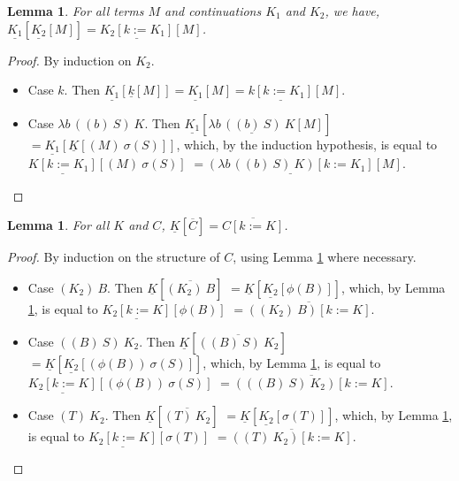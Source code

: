 \documentclass{LMCS}
\newtheorem{lemma}[theorem]{Lemma}
\begin{document}
\begin{lemma}
  \label{lem:continuation-composition-a} For all terms $M$ and continuations
  $K_{1}$ and $K_{2}$, we have,
  $\underline{K_{1}}[\underline{K_{2}}[M]]=\underline{K_{2}[k:=K_{1}]}[M]$.
\end{lemma}
\begin{proof}
  By induction on $K_{2}$.
  \begin{itemize}
    \item Case $k$. Then $\underline{K_{1}}[\underline{k}[M]]=\underline{K_{1}}[M]=\underline{k[k:=K_{1}]}[M]$.
    \item Case $\lambda b\,((b)~S)~K$. Then 
      $\underline{K_{1}}[\underline{\lambda b\,((b)~S)~K}[M]]$
      $=\underline{K_{1}}[\underline{K}[(M)~\sigma(S)]]$,
      which, by the induction hypothesis, is equal to
      $\underline{K[k:=K_{1}]}[(M)~\sigma(S)]$
      $=\underline{(\lambda b\,((b)~S)~K)[k:=K_{1}]}[M]$.
      \qedhere
  \end{itemize}
\end{proof}

\begin{lemma}
  {\label{lem:continuation-substitution-a} For all $K$ and
  $C$, $\underline{K}[\overline{C}]=\overline{C[k:=K]}$}.
\end{lemma}
\begin{proof}
  By induction on the structure of $C$, using Lemma \ref{lem:continuation-composition-a}
  where necessary.
  \begin{itemize}
    \item Case $(K_{2})~B$. Then 
      $\underline{K}[\overline{(K_{2})~B}]$
      $=\underline{K}[\underline{K_{2}}[\phi(B)]]$,
      which, by Lemma \ref{lem:continuation-composition-a}, is equal to
      $\underline{K_{2}[k:=K]}[\phi(B)]$
      $=\overline{((K_{2})~B)[k:=K]}$.

    \item Case $((B)~S)~K_{2}$. Then 
      $\underline{K}[\overline{((B)~S)~K_{2}}]$
      $=\underline{K}[\underline{K_{2}}[(\phi(B))~\sigma(S)]]$,
      which, by Lemma \ref{lem:continuation-composition-a}, is equal to
      $\underline{K_{2}[k:=K]}[(\phi(B))~\sigma(S)]$
      $=\overline{(((B)~S)~K_{2})[k:=K]}$.

    \item Case $(T)~K_{2}$. Then 
      $\underline{K}[\overline{(T)~K_{2}}]$
      $=\underline{K}[\underline{K_{2}}[\sigma(T)]]$,
      which, by Lemma \ref{lem:continuation-composition-a}, is equal to
      $\underline{K_{2}[k:=K]}[\sigma(T)]$
      $=\overline{((T)~K_{2})[k:=K]}$.
      \qedhere
  \end{itemize}
\end{proof}
\end{document}
